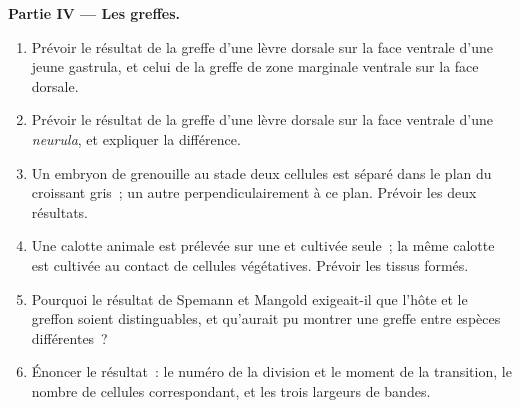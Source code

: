 \begin{problem}
\medskip
\noindent\textbf{Partie IV --- Les greffes.}
\begin{enumerate}[resume]
  \item Prévoir le résultat de la greffe d'une lèvre dorsale sur la face
        ventrale d'une jeune gastrula, et celui de la greffe de zone
        marginale ventrale sur la face dorsale.
  \item Prévoir le résultat de la greffe d'une lèvre dorsale sur la face
        ventrale d'une \emph{neurula}, et expliquer la différence.
  \item Un embryon de grenouille au stade deux cellules est séparé dans
        le plan du croissant gris~; un autre perpendiculairement à ce
        plan. Prévoir les deux résultats.
  \item Une calotte animale est prélevée sur une  et cultivée
        seule~; la même calotte est cultivée au contact de cellules
        végétatives. Prévoir les tissus formés.
  \item Pourquoi le résultat de Spemann et Mangold exigeait-il que l'hôte
        et le greffon soient distinguables, et qu'aurait pu montrer une
        greffe entre espèces différentes~?
  \item Énoncer le résultat~: le numéro de la division et le moment de
        la transition, le nombre de cellules correspondant, et les trois
        largeurs de bandes.
\end{enumerate}
\end{problem}
